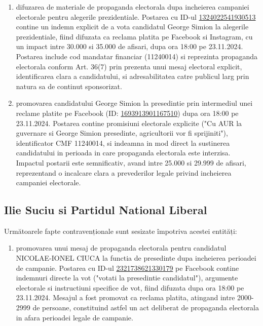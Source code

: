 \documentclass[a4paper,12pt]{article}
\begin{document}
\begin{enumerate}[leftmargin=*, label=\arabic*.)]
    \item difuzarea de materiale de propaganda electorala dupa incheierea campaniei electorale pentru alegerile prezidentiale. Postarea cu ID-ul \href{https://www.facebook.com/ads/library/?id=1324022541930513}{1324022541930513} contine un indemn explicit de a vota candidatul George Simion la alegerile prezidentiale, fiind difuzata ca reclama platita pe Facebook si Instagram, cu un impact intre 30.000 si 35.000 de afisari, dupa ora 18:00 pe 23.11.2024. Postarea include cod mandatar financiar (11240014) si reprezinta propaganda electorala conform Art. 36(7) prin prezenta unui mesaj electoral explicit, identificarea clara a candidatului, si adresabilitatea catre publicul larg prin natura sa de continut sponsorizat.
    \item promovarea candidatului George Simion la presedintie prin intermediul unei reclame platite pe Facebook (ID: \href{https://www.facebook.com/ads/library/?id=1693913901167510}{1693913901167510}) dupa ora 18:00 pe 23.11.2024. Postarea contine promisiuni electorale explicite ("Cu AUR la guvernare si George Simion presedinte, agricultorii vor fi sprijiniti"), identificator CMF 11240014, si indeamna in mod direct la sustinerea candidatului in perioada in care propaganda electorala este interzisa. Impactul postarii este semnificativ, avand intre 25.000 si 29.999 de afisari, reprezentand o incalcare clara a prevederilor legale privind incheierea campaniei electorale.
\end{enumerate}

\vspace{0.5cm}

\subsection{Ilie Suciu si Partidul National Liberal}
Următoarele fapte contravenționale sunt sesizate împotriva acestei entități:

\begin{enumerate}[leftmargin=*, label=\arabic*.)]
    \item promovarea unui mesaj de propaganda electorala pentru candidatul NICOLAE-IONEL CIUCA la functia de presedinte dupa incheierea perioadei de campanie. Postarea cu ID-ul \href{https://www.facebook.com/ads/library/?id=2321738621330179}{2321738621330179} pe Facebook contine indemnuri directe la vot ("votati la presedintie candidatul"), argumente electorale si instructiuni specifice de vot, fiind difuzata dupa ora 18:00 pe 23.11.2024. Mesajul a fost promovat ca reclama platita, atingand intre 2000-2999 de persoane, constituind astfel un act deliberat de propaganda electorala in afara perioadei legale de campanie.
\end{enumerate}
\end{document}
